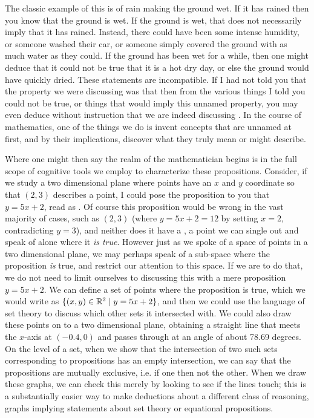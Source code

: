 \documentclass[11pt]{article}
\begin{document}
The classic example of this is of rain making the ground wet. If it has rained then you know that the ground is wet. If the ground is wet, that does not necessarily imply that it has rained. Instead, there could have been some intense humidity, or someone washed their car, or someone simply covered the ground with as much water as they could. If the ground has been wet for a while, then one might deduce that it could not be true that it is a hot dry day, or else the ground would have quickly dried. These statements are incompatible. If I had not told you that the property we were discussing was that  then from the various things I told you could not be true, or things that would imply this unnamed property, you may even deduce without instruction that we are indeed discussing . In the course of  mathematics, one of the things we do is invent concepts that are unnamed at first, and by their implications, discover what they truly mean or might describe.

Where one might then say the realm of the mathematician begins is in the full scope of cognitive tools we employ to characterize these propositions. Consider, if we study a two dimensional plane where points have an $x$ and $y$ coordinate so that $(2,3)$ describes a point, I could pose the proposition to you that $y = 5 x + 2$, read as . Of course this proposition would be wrong in the vast majority of cases, such as $(2,3)$ (where $y = 5 x + 2 = 12$ by setting $x=2$, contradicting $y=3$), and neither does it have a , a point we can single out and speak of alone where it \emph{is true}. However just as we spoke of a space of points in a two dimensional plane, we may perhaps speak of a sub-space where the proposition \emph{is} true, and restrict our attention to this space. If we are to do that, we do not need to limit ourselves to discussing this with a mere proposition $y = 5 x + 2$. We can define a set of points where the proposition is true, which we would write as $\{(x,y) \in \mathbb{R}^2 \hspace{1mm} | \hspace{1mm} y = 5 x + 2\}$, and then we could use the language of set theory to discuss which other sets it intersected with. We could also draw these points on to a two dimensional plane, obtaining a straight line that meets the $x$-axis at $(-0.4,0)$ and passes through at an angle of about 78.69 degrees. On the level of a set, when we show that the intersection of two such sets corresponding to propositions has an empty intersection, we can say that the propositions are mutually exclusive, i.e. if one then not the other. When we draw these graphs, we can check this merely by looking to see if the lines touch; this is a substantially easier way to make deductions about a different class of reasoning, graphs implying statements about set theory or equational propositions.
\end{document}
